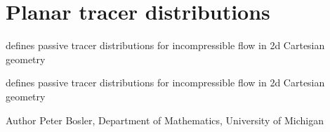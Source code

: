 \hypertarget{group__PlaneTracer}{\section{Planar tracer distributions}
\label{group__PlaneTracer}
}


defines passive tracer distributions for incompressible flow in 2d Cartesian geometry  


defines passive tracer distributions for incompressible flow in 2d Cartesian geometry 

\begin{DoxyAuthor}{Author}
Peter Bosler, Department of Mathematics, University of Michigan 
\end{DoxyAuthor}
